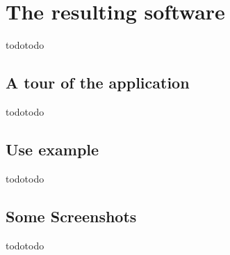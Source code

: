 
\chapter{The resulting software} %

\label{Chapter 5} %


todotodo 

\section{A tour of the application}
todotodo

\section{Use example}
todotodo

\section{Some Screenshots}
todotodo
